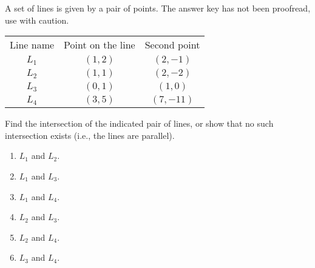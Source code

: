 A set of lines is given by a pair of points. The answer key has not been proofread, use with caution.

\begin{tabular}{ccc}
Line name& Point on the line& Second point \\
$L_1$& $(1,2)$ & $(2,-1)$\\
$L_2$& $(1,1)$ & $(2,-2)$\\
$L_3$& $(0,1)$ & $(1,0)$\\
$L_4$& $(3,5)$ & $(7,-11)$\\
\end{tabular}

Find the intersection of the indicated pair of lines, or show that no such intersection exists (i.e., the lines are parallel).

\begin{enumerate}[ref={\fcProblemRef}]
\item $L_1$ and $L_2$.

\item $L_1$ and $L_3$.

\item \label{problemFindIntersectionLinesThrough((1,2),(2,-1))and((3,5),(7,-11))} $L_1$ and $L_4$.

\item $L_2$ and $L_3$. 

\item $L_2$ and $L_4$.

\item $L_3$ and $L_4$.

\end{enumerate}